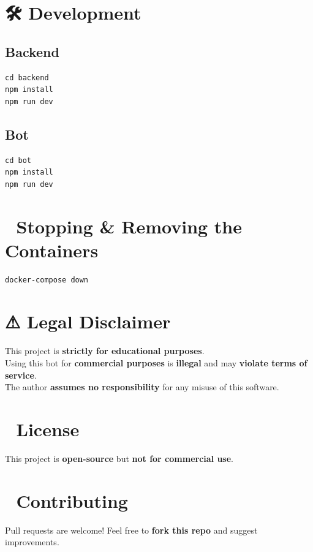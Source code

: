 \documentclass{article}
\begin{document}
\section*{🛠 Development}

\subsection*{Backend}
\begin{verbatim}
cd backend
npm install
npm run dev
\end{verbatim}

\subsection*{Bot}
\begin{verbatim}
cd bot
npm install
npm run dev
\end{verbatim}

\section*{📜 Stopping \& Removing the Containers}
\begin{verbatim}
docker-compose down
\end{verbatim}

\section*{⚠ Legal Disclaimer}
This project is \textbf{strictly for educational purposes}. \\
Using this bot for \textbf{commercial purposes} is \textbf{illegal} and may \textbf{violate terms of service}. \\
The author \textbf{assumes no responsibility} for any misuse of this software.

\section*{📜 License}
This project is \textbf{open-source} but \textbf{not for commercial use}.

\section*{🤝 Contributing}
Pull requests are welcome! Feel free to \textbf{fork this repo} and suggest improvements. 🚀
\end{document}
